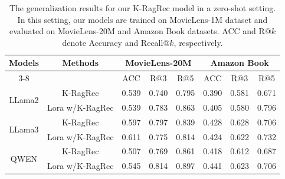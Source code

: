 \begin{table}[t]
  \centering
  \caption{ The generalization results for our K-RagRec model in a zero-shot setting. In this setting, our models are trained on MovieLens-1M dataset and evaluated on MovieLens-20M and Amazon Book datasets.  ACC and R@$k$ denote Accuracy
and Recall@$k$, respectively.}
  \vskip -0.05in
    \scalebox{0.57}
{
    \begin{tabular}{c|c|c|c|c|c|c|c}
    \toprule
    \toprule
    \multirow{2}{*}{Models}  & \multirow{2}{*}{Methods} & \multicolumn{3}{c|}{MovieLens-20M} & \multicolumn{3}{c}{Amazon Book} \\
    \cmidrule{3-8}
    & & \multicolumn{1}{c|}{ACC} & \multicolumn{1}{c|}{R@3} & \multicolumn{1}{c|}{R@5} & \multicolumn{1}{c|}{ACC} & \multicolumn{1}{c|}{R@3} & \multicolumn{1}{c}{R@5} \\
    \midrule
 \multirow{2}{*}{LLama2} & K-RagRec &0.539  &0.740 &0.795 &0.390  &0.581 &0.671    \\
  & Lora w/K-RagRec &0.539  &0.783 &0.863 &0.405 &0.580 &0.796   \\
  \midrule
\multirow{2}{*}{LLama3} &K-RagRec  &0.597 &0.797 &0.839 &0.428 &0.628 &0.706 \\
 & Lora w/K-RagRec  &0.611  &0.775 &0.814 &0.424 &0.622 &0.732  \\
 \midrule
\multirow{2}{*}{QWEN} &K-RagRec  &0.507 &0.769 &0.861 &0.418 &0.612  &0.687\\
 & Lora w/K-RagRec &0.545  &0.814 &0.897 &0.441 &0.623 &0.706   \\
    \bottomrule
    \bottomrule
    \end{tabular}%
}
  \label{tab:transferability}%
  \vskip -0.06in
\end{table}%